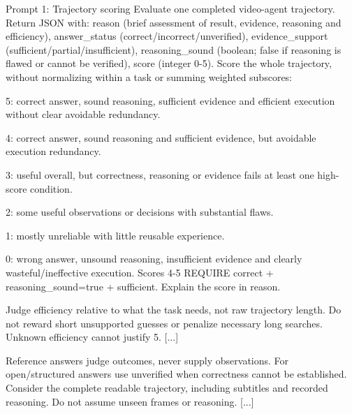 \begin{AppendixPrompt}{Prompt 1: Trajectory scoring}
Evaluate one completed video-agent trajectory. Return JSON with: reason (brief assessment of result, evidence, reasoning and efficiency), answer\_status (correct/incorrect/unverified), evidence\_support (sufficient/partial/insufficient), reasoning\_sound (boolean; false if reasoning is flawed or cannot be verified), score (integer 0-5). Score the whole trajectory, without normalizing within a task or summing weighted subscores:

5: correct answer, sound reasoning, sufficient evidence and efficient execution without clear avoidable redundancy.

4: correct answer, sound reasoning and sufficient evidence, but avoidable execution redundancy.

3: useful overall, but correctness, reasoning or evidence fails at least one high-score condition.

2: some useful observations or decisions with substantial flaws.

1: mostly unreliable with little reusable experience.

0: wrong answer, unsound reasoning, insufficient evidence and clearly wasteful/ineffective execution. Scores 4-5 REQUIRE correct + reasoning\_sound=true + sufficient. Explain the score in reason.

Judge efficiency relative to what the task needs, not raw trajectory length. Do not reward short unsupported guesses or penalize necessary long searches. Unknown efficiency cannot justify 5. [...]

Reference answers judge outcomes, never supply observations. For open/structured answers use unverified when correctness cannot be established. Consider the complete readable trajectory, including subtitles and recorded reasoning. Do not assume unseen frames or reasoning. [...]
\end{AppendixPrompt}

